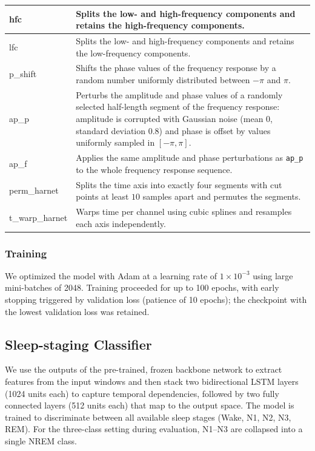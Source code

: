 \documentclass[journal,twoside,web]{ieeecolor}
\begin{document}
\begin{table}[h]
\begin{tabular}{|p{18mm}|p{68mm}|}
    hfc & Splits the low- and high-frequency components and retains the high-frequency components. \\ \hline

    lfc & Splits the low- and high-frequency components and retains the low-frequency components. \\ \hline

    p\_shift & Shifts the phase values of the frequency response by a random number uniformly distributed between $-\pi$ and $\pi$. \\ \hline

    ap\_p & Perturbs the amplitude and phase values of a randomly selected half-length segment of the frequency response: amplitude is corrupted with Gaussian noise (mean $0$, standard deviation $0.8$) and phase is offset by values uniformly sampled in $[-\pi,\pi]$. \\ \hline

    ap\_f & Applies the same amplitude and phase perturbations as \texttt{ap\_p} to the whole frequency response sequence. \\ \hline

    perm\_harnet & Splits the time axis into exactly four segments with cut points at least $10$ samples apart and permutes the segments. \\ \hline

    t\_warp\_harnet & Warps time per channel using cubic splines and resamples each axis independently. \\ \hline

  \end{tabular}
\end{table}
\subsubsection{Training}
We optimized the model with Adam at a learning rate of $1\times10^{-3}$ using large mini-batches of 2048. Training proceeded for up to 100 epochs, with early stopping triggered by validation loss (patience of 10 epochs); the checkpoint with the lowest validation loss was retained.
\subsection{Sleep-staging Classifier}
We use the outputs of the pre-trained, frozen backbone network to extract features from the input windows and then stack two bidirectional LSTM layers (1024 units each) to capture temporal dependencies, followed by two fully connected layers (512 units each) that map to the output space. The model is trained to discriminate between all available sleep stages (Wake, N1, N2, N3, REM). For the three-class setting during evaluation, N1–N3 are collapsed into a single NREM class.
\end{document}
